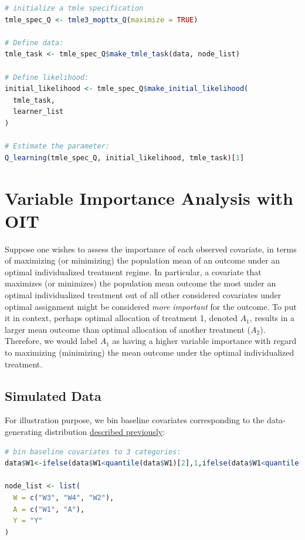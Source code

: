 \documentclass[
  12pt, krantz2,
]{krantz}
\theoremstyle{definition}
\theoremstyle{definition}
\theoremstyle{definition}
\newcommand{\1}{\mathbbm{1}}
\begin{document}
\begin{lstlisting}[language=R]
# initialize a tmle specification
tmle_spec_Q <- tmle3_mopttx_Q(maximize = TRUE)

# Define data:
tmle_task <- tmle_spec_Q$make_tmle_task(data, node_list)

# Define likelihood:
initial_likelihood <- tmle_spec_Q$make_initial_likelihood(
  tmle_task,
  learner_list
)

# Estimate the parameter:
Q_learning(tmle_spec_Q, initial_likelihood, tmle_task)[1]
\end{lstlisting}

\hypertarget{variable-importance-analysis-with-oit}{%
\section{Variable Importance Analysis with OIT}\label{variable-importance-analysis-with-oit}}

Suppose one wishes to assess the importance of each observed covariate, in
terms of maximizing (or minimizing) the population mean of an outcome under an
optimal individualized treatment regime. In particular, a covariate that
maximizes (or minimizes) the population mean outcome the most under an optimal
individualized treatment out of all other considered covariates under optimal
assignment might be considered \emph{more important} for the outcome. To put it in
context, perhaps optimal allocation of treatment 1, denoted \(A_1\), results in a
larger mean outcome than optimal allocation of another treatment (\(A_2\)).
Therefore, we would label \(A_1\) as having a higher variable importance with
regard to maximizing (minimizing) the mean outcome under the optimal
individualized treatment.

\hypertarget{simulated-data-2}{%
\subsection{Simulated Data}\label{simulated-data-2}}

For illustration purpose, we bin baseline covariates corresponding to
the data-generating distribution \protect\hyperlink{oit-eval}{described previously}:

\begin{lstlisting}[language=R]
# bin baseline covariates to 3 categories:
data$W1<-ifelse(data$W1<quantile(data$W1)[2],1,ifelse(data$W1<quantile(data$W1)[3],2,3))

node_list <- list(
  W = c("W3", "W4", "W2"),
  A = c("W1", "A"),
  Y = "Y"
)
\end{lstlisting}
\end{document}

